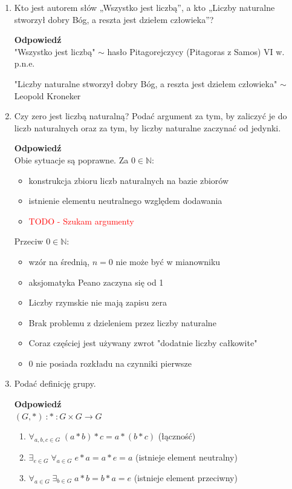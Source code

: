 \documentclass[12pt,a4paper]{article}
\theoremstyle{break}
\newcommand{\Odp}[1]{
		\begin{mdframed}[style=zadanie]
			\textbf{Odpowiedź}\\
			#1
		\end{mdframed}
	}
\begin{document}
	\begin{enumerate}[1.]
	\item Kto jest autorem słów „Wszystko jest liczbą”, a kto „Liczby naturalne stworzył dobry Bóg, a reszta jest dziełem człowieka”?
	\Odp{
	"Wszystko jest liczbą" $\sim$ hasło Pitagorejczycy (Pitagoras z Samos) VI w. p.n.e.
	
	"Liczby naturalne stworzył dobry Bóg, a reszta jest dziełem człowieka" $\sim$ Leopold Kroneker
	}
	
	\item Czy zero jest liczbą naturalną? Podać argument za tym, by zaliczyć je do liczb naturalnych oraz za tym, by liczby naturalne zaczynać od jedynki.
	\Odp{
		Obie sytuacje są poprawne. 
		Za $0\in\mathbb{N}$: 
		\begin{itemize}
			\item konstrukcja zbioru liczb naturalnych na bazie zbiorów
			\item istnienie elementu neutralnego względem dodawania
			\item \textcolor{red}{TODO - Szukam argumenty}
		\end{itemize}
		
		Przeciw $0\in\mathbb{N}$:
		\begin{itemize}
			\item wzór na średnią, $n=0$ nie może być w mianowniku
			\item aksjomatyka Peano zaczyna się od 1
			\item Liczby rzymskie nie mają zapisu zera
			\item Brak problemu z dzieleniem przez liczby naturalne
			\item Coraz częściej jest używany zwrot "dodatnie liczby całkowite"
			\item 0 nie posiada rozkładu na czynniki pierwsze
		\end{itemize}
	}
	
	\item Podać definicję grupy.
	\Odp{
	$(G,*) \:: * \:: G \times G \longrightarrow G$
	\begin{enumerate}[1)]
		\item $\forall_{a,b,c \in G} \;(a*b)*c = a*(b*c)$ (łączność)
		\item $\exists_{e\in G} \; \forall_{a\in G} \; e*a=a*e=a$ (istnieje element neutralny)
		\item $\forall_{a\in G} \; \exists_{b\in G} \; a*b=b*a=e$ (istnieje element przeciwny)
	\end{enumerate}
	}
	

\end{enumerate}
\end{document}
